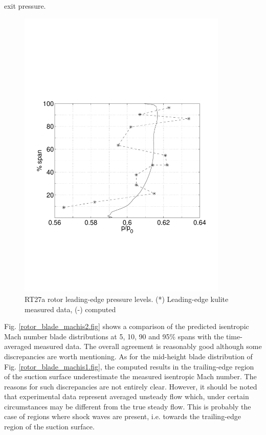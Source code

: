  exit pressure.
%
\begin{figure}
  \centerline{\includegraphics[width=100mm,clip=t]{CHAP_RT27/FIGURE/rot_le.pdf}}
  \caption{RT27a rotor leading-edge pressure levels. (*) Leading-edge kulite
           measured data, (-) computed}
  \label{rotor_le.fig}
\end{figure}
%
 Fig. \ref{rotor_blade_machis2.fig} shows a comparison of the predicted
 isentropic Mach number blade distributions at 5, 10, 90 and 95\%
 spans with the time-averaged measured data.
 The overall agreement is reasonably good although some discrepancies
 are worth mentioning.
 As for the mid-height blade distribution of Fig. \ref{rotor_blade_machis1.fig},
 the computed results in the trailing-edge region of the suction surface
 underestimate the measured isentropic Mach number.
 The reasons for such discrepancies are not entirely clear. However, it should
 be noted that experimental data represent averaged unsteady flow which,
 under certain circumstances may be different from the true steady flow.
 This is probably the case of regions where shock waves are present, i.e.
 towards the trailing-edge region of the suction surface.
%
%

